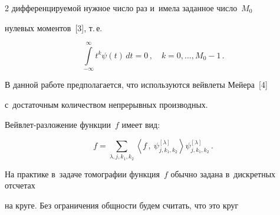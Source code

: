 \begin{multicols}{2}
дифференцируемой нужное число раз и~имела заданное число~$M_0$


нулевых моментов~[3], т.\,е.





\vspace*{4pt}





\noindent


$$


\int\limits_{-\infty}^{\infty}t^k\psi(t)\,dt=0\,,\quad k=0,\ldots,M_0-1\,.


$$





\vspace*{-2pt}





\noindent


В данной работе предполагается, что используются вейвлеты Мейера~[4]


с~достаточным количеством непрерывных производных.





Вейвлет-разложение функции~$f$ имеет вид:





\vspace*{4pt}





\noindent


\begin{equation}


\label{waveletdecomp}


f = \sum\limits_{\lambda,j,k_1,k_2} \left\langle f\,,\


\psi^{[\lambda]}_{j,k_1,k_2}\right\rangle \psi^{[\lambda]}_{j,k_1,k_2}\,.


\end{equation}








\vspace*{-2pt}





На практике в~задаче томографии функция~$f$ обычно задана в~дискретных отсчетах


на круге. Без ограничения общности будем считать, что это круг



\end{multicols}
